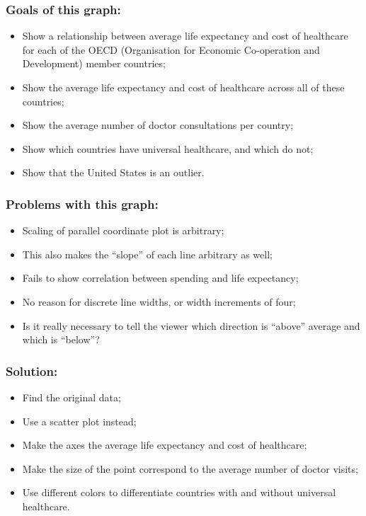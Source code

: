 \documentclass{beamer}
\begin{document}
\begin{frame}
    \frametitle{Goals of this graph:}
    \begin{itemize}
        \item Show a relationship between average life expectancy and cost of healthcare for each of the OECD (Organisation for Economic Co-operation and Development) member countries;
        \item Show the average life expectancy and cost of healthcare across all of these countries;
        \item Show the average number of doctor consultations per country;
        \item Show which countries have universal healthcare, and which do not;
        \item Show that the United States is an outlier.
    \end{itemize}
\end{frame}

\begin{frame}
    \frametitle{Problems with this graph:}
    \begin{itemize}
        \item Scaling of parallel coordinate plot is arbitrary;
        \item This also makes the ``slope'' of each line arbitrary as well;
        \item Fails to show correlation between spending and life expectancy;
        \item No reason for discrete line widths, or width increments of four;
        \item Is it really necessary to tell the viewer which direction is ``above'' average and which is ``below''?
    \end{itemize}
\end{frame}

\begin{frame}
    \frametitle{Solution:}
    \begin{itemize}
        \item Find the original data;
        \item Use a scatter plot instead;
        \item Make the axes the average life expectancy and cost of healthcare;
        \item Make the size of the point correspond to the average number of doctor visits;
        \item Use different colors to differentiate countries with and without universal healthcare.
    \end{itemize}
\end{frame}
\end{document}
